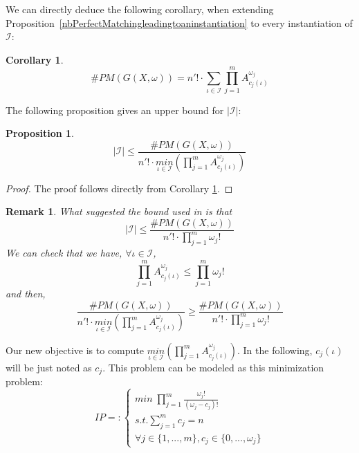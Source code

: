 \documentclass[jair,twoside,11pt,theapa]{article}
\newtheorem{proposition}[theorem]{Proposition}
\newtheorem{corollary}[theorem]{Corollary}
\newtheorem*{remark}{Remark}
\newcommand{\nbperfectmatching}[1]{\#PM(#1)}
\begin{document}
We can directly deduce the following corollary, when extending Proposition~\ref{nbPerfectMatchingleadingtoaninstantiation} to every instantiation of $\mathcal{I}$:
\begin{corollary}
	\begin{equation}
	\nbperfectmatching{G(X, \omega)} = n'! \cdot \underset{\iota \in \mathcal{I}}{\sum} \prod_{j=1}^m A^{\omega_j}_{c_j(\iota)} 
	\end{equation}
	\label{corollary1}
\end{corollary}

The following proposition gives an upper bound for $|\mathcal{I}|$:
\begin{proposition}
	\begin{equation}
		|\mathcal{I}| \leq \frac{\nbperfectmatching{G(X,\omega)}}{n'! \cdot \underset{\iota \in \mathcal{I}}{min}(\prod_{j=1}^m A_{c_j(\iota)}^{\omega_j})}
	\end{equation}
\end{proposition}

\begin{proof}
The proof follows directly from Corollary \ref{corollary1}.
\end{proof}

\begin{remark}
What suggested the bound used in \cite{PesantQZ12} is that 
\begin{equation*}
		|\mathcal{I}| \leq \frac{\nbperfectmatching{G(X,\omega)}}{n'! \cdot \prod_{j=1}^m \omega_j!}
\end{equation*}
We can check that we have, $\forall \iota \in \mathcal{I}$,
\begin{equation*}
	\prod_{j=1}^m A_{c_j(\iota)}^{\omega_j} \leq \prod_{j=1}^m \omega_j!
\end{equation*}
and then,
\begin{equation*}
	\frac{\nbperfectmatching{G(X,\omega)}}{n'! \cdot \underset{\iota \in \mathcal{I}}{min}(\prod_{j=1}^m A_{c_j(\iota)}^{\omega_j})} \geq \frac{\nbperfectmatching{G(X,\omega)}}{n'! \cdot \prod_{j=1}^m \omega_j!}
\end{equation*}		
\end{remark}

Our new objective is to compute $\underset{\iota \in \mathcal{I}}{min}(\prod_{j=1}^m A_{c_j(\iota)}^{\omega_j})$. In the following, $c_j(\iota)$ will be just noted as $c_j$. This problem can be modeled as this minimization problem:
\begin{equation}
IP = \colon\begin{cases}
min \; \prod_{j=1}^m \frac{\omega_j !}{(\omega_j - c_j) !}\\
s.t. \sum_{j=1}^m c_j = n \\
\forall j \in \lbrace 1,...,m\rbrace, c_j \in \lbrace 0,..., \omega_j \rbrace
\end{cases}
\end{equation}
\end{document}
